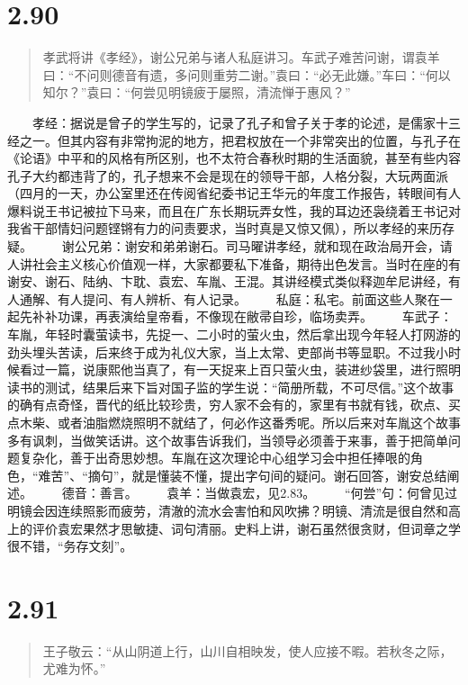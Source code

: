 \documentclass[]{book}
\begin{document}
\section{2.90}\label{section-136}

\begin{quote}
孝武将讲《孝经》，谢公兄弟与诸人私庭讲习。车武子难苦问谢，谓袁羊曰：``不问则德音有遗，多问则重劳二谢。''袁曰：``必无此嫌。''车曰：``何以知尔？''袁曰：``何尝见明镜疲于屡照，清流惮于惠风？''
\end{quote}

　　孝经：据说是曾子的学生写的，记录了孔子和曾子关于孝的论述，是儒家十三经之一。但其内容有非常拘泥的地方，把君权放在一个非常突出的位置，与孔子在《论语》中平和的风格有所区别，也不太符合春秋时期的生活面貌，甚至有些内容孔子大约都违背了的，孔子想来不会是现在的领导干部，人格分裂，大玩两面派（四月的一天，办公室里还在传阅省纪委书记王华元的年度工作报告，转眼间有人爆料说王书记被拉下马来，而且在广东长期玩弄女性，我的耳边还袅绕着王书记对我省干部情妇问题铿锵有力的问责要求，当时真是又惊又佩），所以孝经的来历存疑。
　　谢公兄弟：谢安和弟弟谢石。司马曜讲孝经，就和现在政治局开会，请人讲社会主义核心价值观一样，大家都要私下准备，期待出色发言。当时在座的有谢安、谢石、陆纳、卞耽、袁宏、车胤、王混。其讲经模式类似释迦牟尼讲经，有人通解、有人提问、有人辨析、有人记录。
　　私庭：私宅。前面这些人聚在一起先补补功课，再表演给皇帝看，不像现在敝帚自珍，临场卖弄。
　　车武子：车胤，年轻时囊萤读书，先捉一、二小时的萤火虫，然后拿出现今年轻人打网游的劲头埋头苦读，后来终于成为礼仪大家，当上太常、吏部尚书等显职。不过我小时候看过一篇，说康熙他当真了，有一天捉来上百只萤火虫，装进纱袋里，进行照明读书的测试，结果后来下旨对国子监的学生说：``简册所载，不可尽信。''这个故事的确有点奇怪，晋代的纸比较珍贵，穷人家不会有的，家里有书就有钱，砍点、买点木柴、或者油脂燃烧照明不就结了，何必作这番秀呢。所以后来对车胤这个故事多有讽刺，当做笑话讲。这个故事告诉我们，当领导必须善于来事，善于把简单问题复杂化，善于出奇思妙想。车胤在这次理论中心组学习会中担任捧哏的角色，``难苦''、``摘句''，就是懂装不懂，提出字句间的疑问。谢石回答，谢安总结阐述。
　　德音：善言。 　　袁羊：当做袁宏，见2.83。
　　``何尝''句：何曾见过明镜会因连续照影而疲劳，清澈的流水会害怕和风吹拂？明镜、清流是很自然和高上的评价袁宏果然才思敏捷、词句清丽。史料上讲，谢石虽然很贪财，但词章之学很不错，``务存文刻''。

\section{2.91}\label{section-137}

\begin{quote}
王子敬云：``从山阴道上行，山川自相映发，使人应接不暇。若秋冬之际，尤难为怀。''
\end{quote}
\end{document}
